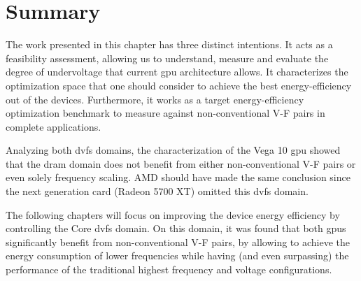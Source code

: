 \section{Summary}

The work presented in this chapter has three distinct intentions. It acts as a feasibility assessment, allowing us to understand, measure and evaluate the degree of undervoltage that current \acrshort{gpu} architecture allows. It characterizes the optimization space that one should consider to achieve the best energy-efficiency out of the devices. Furthermore, it works as a target energy-efficiency optimization benchmark to measure against non-conventional V-F pairs in complete applications.

Analyzing both \acrshort{dvfs} domains, the characterization of the Vega 10 \acrshort{gpu} showed that the \acrshort{dram} domain does not benefit from either non-conventional V-F pairs or even solely frequency scaling. AMD should have made the same conclusion since the next generation card (Radeon 5700 XT) omitted this \acrshort{dvfs} domain.

The following chapters will focus on improving the device energy efficiency by controlling the Core \acrshort{dvfs} domain. On this domain, it was found that both \acrshort{gpu}s significantly benefit from non-conventional V-F pairs, by allowing to achieve the energy consumption of lower frequencies while having (and even surpassing) the performance of the traditional highest frequency and voltage configurations.
